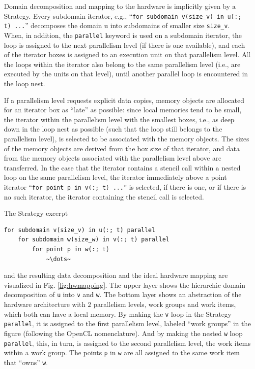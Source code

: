Domain decomposition and mapping to the hardware is implicitly given by a Strategy.
Every subdomain iterator, e.g., ``\lstinline[language=strategy]!for subdomain v(size_v) in u(:; t) ...!''
decomposes the domain u into subdomains
of smaller size \texttt{size\_v}. When, in addition, the \texttt{parallel} keyword is used on a subdomain iterator,
the loop is assigned to the next parallelism level (if there is one available), and each of the iterator boxes is assigned
to an execution unit on that parallelism level. All the loops within the iterator also belong to the same parallelism level (i.e., are
executed by the units on that level), until another parallel loop is encountered in the loop nest.

If a parallelism level requests explicit data copies, memory objects are allocated for an iterator box as ``late'' as possible:
since local memories tend to be small, the iterator within the parallelism level with the smallest boxes, i.e., as deep down
in the loop nest as possible (such that the loop still belongs to the parallelism level), is selected to be associated with
the memory objects. The sizes of the memory objects are derived from the box size of that iterator, and data from the
memory objects associated with the parallelism level above are transferred.
In the case that the iterator contains a stencil call within a nested loop on the same parallelism level, the iterator
immediately above a point iterator ``\lstinline[language=strategy]!for point p in v(:; t) ...!'' is selected, if there is one,
or if there is no such iterator, the iterator containing the stencil call is selected.

The Strategy excerpt 
\begin{lstlisting}[language=strategy]
for subdomain v(size_v) in u(:; t) parallel
	for subdomain w(size_w) in v(:; t) parallel
		for point p in w(:; t)
			~\dots~
\end{lstlisting}
and the resulting data decomposition and the ideal hardware mapping
are visualized in Fig. \ref{fig:hwmapping}. The upper layer shows the hierarchic domain decomposition of \texttt{u} into
\texttt{v} and \texttt{w}. The bottom layer shows an abstraction of the hardware architecture with $2$ parallelism levels,
work groups and work items, which both can have a local memory. By making the \texttt{v} loop in the Strategy \texttt{parallel},
it is assigned to the first parallelism level, labeled ``work groups'' in the figure (following the OpenCL nomenclature).
And by making the nested \texttt{w} loop \texttt{parallel},
this, in turn, is assigned to the second parallelism level, the work items within a work group. The points \texttt{p} in \texttt{w} are
all assigned to the same work item that ``owns'' \texttt{w}.

